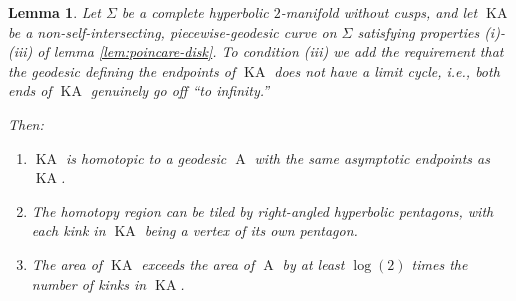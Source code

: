 \documentclass[a4paper,11pt]{article}
\newcommand{\KA}{\operatorname{KA}}
\newcommand{\A}{\operatorname{A}}
\newtheorem{lemma}[theorem]{Lemma}
\begin{document}
\begin{lemma}
    \label{lem:homotopy-shrinking-asymptotic}
    Let $\Sigma$ be a complete hyperbolic $2$-manifold without cusps, and let $\KA$ be a non-self-intersecting, piecewise-geodesic curve on $\Sigma$ satisfying properties (i)-(iii) of lemma \ref{lem:poincare-disk}. To condition (iii) we add the requirement that the geodesic defining the endpoints of $\KA$ does not have a limit cycle, i.e., both ends of $\KA$ genuinely go off ``to infinity.''
    
    Then:
    \begin{enumerate}[(1)]
        \item $\KA$ is homotopic to a geodesic $\A$ with the same asymptotic endpoints as $\KA$.
        \item The homotopy region can be tiled by right-angled hyperbolic pentagons, with each kink in $\KA$ being a vertex of its own pentagon.
        \item The area of $\KA$ exceeds the area of $\A$ by at least $\log(2)$ times the number of kinks in $\KA$.
    \end{enumerate}
\end{lemma}
\end{document}

